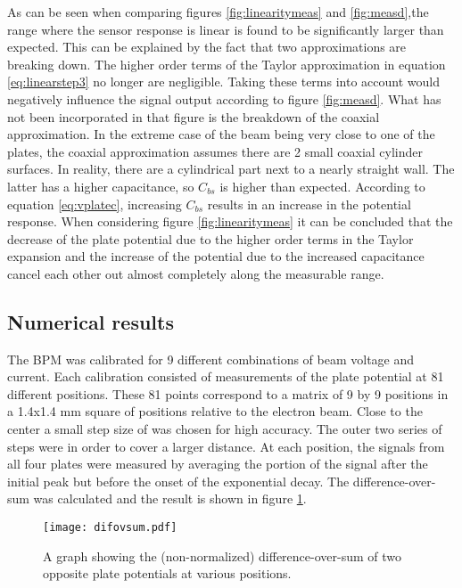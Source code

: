 As can be seen when comparing figures \ref{fig:linearitymeas} and \ref{fig:measd},the range where the sensor response is linear is found to be significantly larger than expected. This can be explained by the fact that two approximations are breaking down. The higher order terms of the Taylor approximation in equation \ref{eq:linearstep3} no longer are negligible. Taking these terms into account would negatively influence the signal output according to figure \ref{fig:measd}. What has not been incorporated in that figure is the breakdown of the coaxial approximation. In the extreme case of the beam being very close to one of the plates, the coaxial approximation assumes there are 2 small coaxial cylinder surfaces. In reality, there are a cylindrical part next to a nearly straight wall. The latter has a higher capacitance, so $C_{bs}$ is higher than expected. According to equation \ref{eq:vplatec}, increasing $C_{bs}$ results in an increase in the potential response. When considering figure \ref{fig:linearitymeas} it can be concluded that the decrease of the plate potential due to the higher order terms in the Taylor expansion and the increase of the potential due to the increased capacitance cancel each other out almost completely along the measurable range.

\subsection{Numerical results}
The BPM was calibrated for 9 different combinations of beam voltage and current. Each calibration consisted of measurements of the plate potential at 81 different positions. These 81 points correspond to a matrix of 9 by 9 positions in a 1.4x1.4 mm square of positions relative to the electron beam. Close to the center a small step size of  was chosen for high accuracy. The outer two series of steps were  in order to cover a larger distance.
At each position, the signals from all four plates were measured by averaging the portion of the signal after the initial peak but before the onset of the exponential decay. The difference-over-sum was calculated and the result is shown in figure \ref{fig:difovsum}.
\begin{figure}[h]
 \centering
 \texttt{[image: difovsum.pdf]}
 \caption{A graph showing the (non-normalized) difference-over-sum of two opposite plate potentials at various positions.}
 \label{fig:difovsum}
\end{figure}

